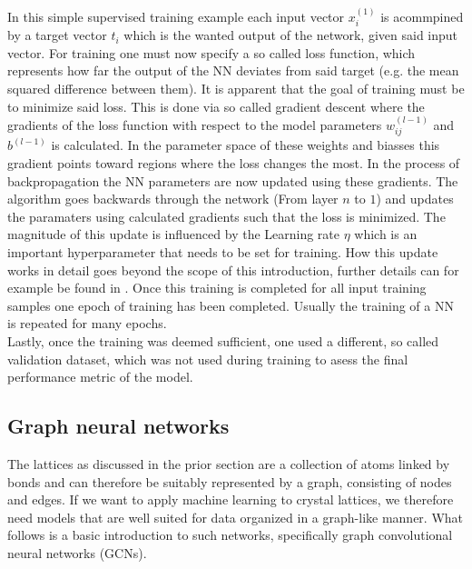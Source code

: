 \documentclass[11pt,a4paper]{article}
\begin{document}
In this simple supervised training example each input vector $x^{(1)}_i$ is acommpined by a target vector $t_i$ which is the wanted output of the network, given said input vector. 
For training one must now specify a so called loss function, which represents how far the output of the NN deviates from said target (e.g. the mean squared difference between them). 
It is apparent that the goal of training must be to minimize said loss. 
This is done via so called gradient descent where the gradients of the loss function with respect to the model parameters $w_{ij}^{(l-1)}$ and  $ b^{(l-1)}$ is calculated. 
In the parameter space of these weights and biasses this gradient points toward regions where the loss changes the most. 
In the process of backpropagation the NN parameters are now updated using these gradients. 
The algorithm goes backwards through the network (From layer $n$ to $1$) and updates the paramaters using calculated gradients such that the loss is minimized. 
The magnitude of this update is influenced by the Learning rate $\eta$ which is an important hyperparameter that needs to be set for training. 
How this update works in detail goes beyond the scope of this introduction, further details can for example be found in \cite{kubatChapter5Artificial2017}. 
Once this training is completed for all input training samples one epoch of training has been completed. 
Usually the training of a NN is repeated for many epochs. \\

Lastly, once the training was deemed sufficient, one used a different, so called validation dataset, which was not used during training to asess the final performance metric of the model. 

\subsection{Graph neural networks}
\label{ssec:Graph neural networks}
The lattices as discussed in the prior section are a collection of atoms linked by bonds and can therefore be suitably represented by a graph, consisting of nodes and edges. 
If we want to apply machine learning to crystal lattices, we therefore need models that are well suited for data organized in a graph-like manner. 
What follows is a basic introduction to such networks, specifically graph convolutional neural networks (GCNs). \\
\end{document}
